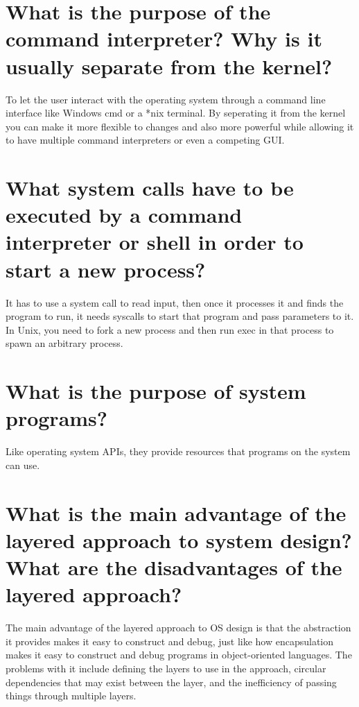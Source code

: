 \documentclass{book}%
\begin{document}
\section{What is the purpose of the command interpreter? Why is it usually 
separate from the kernel?}
To let the user interact with the operating system through a command line 
interface like Windows cmd or a *nix terminal. By seperating it from the kernel 
you can make it more flexible to changes and also more powerful while allowing 
it to have multiple command interpreters or even a competing GUI. 
\section{What system calls have to be executed by a command interpreter or shell
in order to start a new process?}%
It has to use a system call to read input, then once it processes it and finds 
the program to run, it needs syscalls to start that program and pass parameters 
to it. \\
In Unix, you need to fork a new process and then run exec in that process to 
spawn an arbitrary process.
\section{What is the purpose of system programs?}
Like operating system APIs, they provide resources that programs on the system 
can use.
\section{What is the main advantage of the layered approach to system design? 
What are the disadvantages of the layered approach?}
The main advantage of the layered approach to OS design is that the abstraction 
it provides makes it easy to construct and debug, just like how encapsulation 
makes it easy to construct and debug programs in object-oriented languages. The 
problems with it include defining the layers to use in the approach, circular 
dependencies that may exist between the layer, and the inefficiency of passing 
things through multiple layers.
\end{document}

